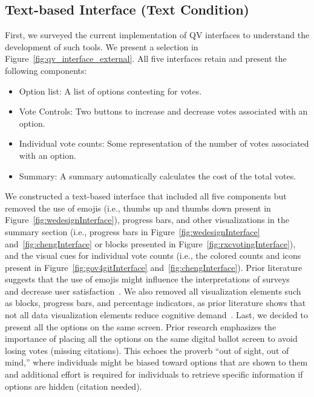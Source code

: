 \subsection{Text-based Interface (Text Condition)}
First, we surveyed the current implementation of QV interfaces to understand the development of such tools. We present a selection in Figure~\ref{fig:qv_interface_external}. All five interfaces retain and present the following components:
\begin{itemize}
    \item Option list: A list of options contesting for votes.
    \item Vote Controls: Two buttons to increase and decrease votes associated with an option.
    \item Individual vote counts: Some representation of the number of votes associated with an option.
    \item Summary: A summary automatically calculates the cost of the total votes.
\end{itemize}

We constructed a text-based interface that included all five components but removed the use of emojis (i.e., thumbs up and thumbs down present in Figure~\ref{fig:wedesignInterface}), progress bars, and other visualizations in the summary section (i.e., progress bars in Figure~\ref{fig:wedesignInterface} and~\ref{fig:chengInterface} or blocks presented in Figure~\ref{fig:rxcvotingInterface}), and the visual cues for individual vote counts (i.e., the colored counts and icons present in Figure~\ref{fig:gov4gitInterface} and~\ref{fig:chengInterface}). Prior literature suggests that the use of emojis might influence the interpretations of surveys~\cite{herringGenderAgeInfluences2020} and decrease user satisfaction~\cite{toepoelSmileysStarsHearts2019}. We also removed all visualization elements such as blocks, progress bars, and percentage indicators, as prior literature shows that not all data visualization elements reduce cognitive demand~\cite{huangMeasuringEffectivenessGraph2009a}. Last, we decided to present all the options on the same screen. Prior research emphasizes the importance of placing all the options on the same digital ballot screen to avoid losing votes (missing citations). This echoes the proverb ``out of sight, out of mind,'' where individuals might be biased toward options that are shown to them and additional effort is required for individuals to retrieve specific information if options are hidden (citation needed).




